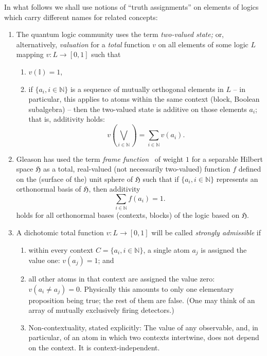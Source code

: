 \documentclass[%
  twocolumn,
 showpacs,
 showkeys,
 preprintnumbers,
 amsmath,amssymb,
 aps,
  pra,
  longbibliography,
 floatfix,
 ]{revtex4-1}
\begin{document}
In what follows we shall use notions of ``truth assignments'' on elements of logics which carry different names for related concepts:
\begin{enumerate}
\item
The quantum logic community uses the term {\em two-valued state;} or, alternatively, {\em valuation}
for a {\em total} function $v$ on all elements of some logic $L$  mapping
$v: L \rightarrow [0,1]$  such that~\cite[Definition~2.1.1, p.~20]{pulmannova-91}
\begin{enumerate}
\item
$v (\mathbb{I}) = 1$,
\item
if $\{ a_i, i \in \mathbb{N}\}$ is a sequence of mutually orthogonal elements in $L$ -- in particular,  this applies to
atoms within the same context (block, Boolean subalgebra) --
then the two-valued state is additive on those elements $a_i$;  that is, additivity holds:
\begin{equation}
v\left( \bigvee_{i \in \mathbb{N}} \right) = \sum_{i \in \mathbb{N}} v(a_i).
\label{2017-ch-pu-qlff}
\end{equation}
\end{enumerate}

\item
Gleason has used the term {\em frame function}~\cite[p.~886]{Gleason}
of weight $1$ for a separable Hilbert space $\mathfrak{H}$ as a
total,
real-valued (not necessarily two-valued) function $f$ defined on the (surface of the)
unit sphere of $\mathfrak{H}$  such that if
$\{ a_i, i \in \mathbb{N}\}$ represents an orthonormal basis  of  $\mathfrak{H}$, then  additivity
\begin{equation}
 \sum_{i \in \mathbb{N}} f(a_i) = 1.
\label{2017-ch-pu-glff}
\end{equation}
holds for all orthonormal bases
(contexts, blocks) of the logic based on  $\mathfrak{H}$.


\item
A dichotomic total function $v: L \rightarrow [0,1]$  will be called   {\em strongly admissible}
if
\begin{enumerate}
\item  within every context $C = \{ a_i, i \in \mathbb{N}\}$, a single atom $a_j$ is assigned the value one: $v(a_j)=1$;
and
\item   all other atoms in that context are assigned the value zero: $v(a_i\neq a_j )=0$.
Physically this amounts to only one elementary proposition being true; the rest of them are false.
(One may think of an array of mutually exclusively firing detectors.)
\item    Non-contextuality, stated explicitly:
The value of any observable, and, in particular, of an atom in which two contexts intertwine, does not depend on the context. It is context-independent.
\end{enumerate}


\end{enumerate}
\end{document}
